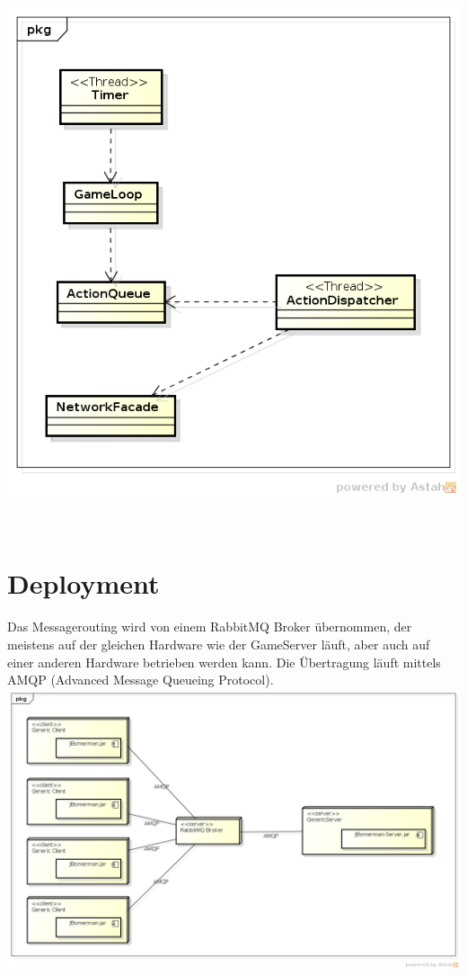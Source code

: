 \documentclass[11pt]{scrartcl}
\begin{document}
\includegraphics[scale=0.8]{ActionDispatcherProzess}



\newpage

 
\section{Deployment}
Das Messagerouting wird von einem RabbitMQ Broker übernommen, der meistens auf der gleichen Hardware wie der GameServer läuft, aber auch auf einer anderen Hardware betrieben werden kann. Die Übertragung läuft mittels AMQP (Advanced Message Queueing Protocol).\\

\includegraphics[scale=0.4]{DeploymentDiagram}
 
\newpage
\end{document}

